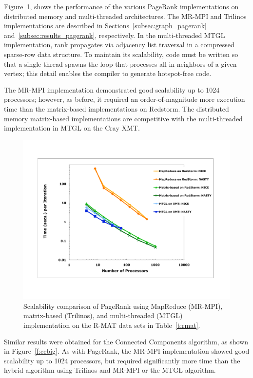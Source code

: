 Figure~\ref{f:prbig}, shows the performance of the various PageRank
implementations on distributed memory and multi-threaded
architectures.  The MR-MPI and Trilinos implementations are described
in Sections~\ref{subsec:graph_pagerank}
and~\ref{subsec:results_pagerank}, respectively.  In the
multi-threaded MTGL implementation, rank propagates via adjacency list
traversal in a compressed sparse-row data structure.  To maintain its
scalability, code must be written so that a single thread spawns the
loop that processes all in-neighbors of a given vertex; this detail
enables the compiler to generate hotspot-free code.

The MR-MPI implementation demonstrated good scalability up to 1024
processors; however, as before, it required an order-of-magnitude more
execution time than the matrix-based implementations on Redstorm.  The
distributed memory matrix-based implementations are competitive with
the multi-threaded implementation in MTGL on the Cray XMT.

\begin{figure}[htb]
\includegraphics[width=\textwidth]{fig_pagerank_big.pdf}
\caption{Scalability comparison of PageRank using MapReduce (MR-MPI),
matrix-based (Trilinos), and multi-threaded (MTGL) implementation on
the R-MAT data sets in Table~\ref{t:rmat}.}
\label{f:prbig}
\end{figure}

Similar results were obtained for the Connected Components algorithm,
as shown in Figure~\ref{f:ccbig}.  As with PageRank, the MR-MPI
implementation showed good scalability up to 1024 processors, but
required significantly more time than the hybrid algorithm using
Trilinos and MR-MPI or the MTGL algorithm.

